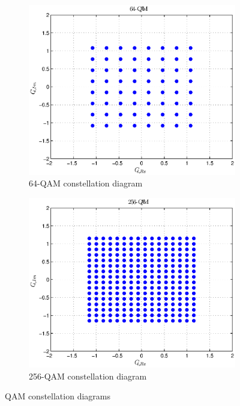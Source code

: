 \begin{figure}[thb]
\begin{subfigure}[b]{0.42\textwidth}
    \includegraphics[width=\linewidth]{figs/64-QAM.eps}
    \caption{64-QAM constellation diagram}
    \label{fig:64QAM}
    \end{subfigure}%
\begin{subfigure}[b]{0.42\textwidth}
    \includegraphics[width=\linewidth]{figs/256-QAM.eps}
    \caption{256-QAM constellation diagram}
    \label{fig:256QAM}
    \end{subfigure}
\caption{QAM constellation diagrams}
\label{fig:QAMconstell}
\end{figure}
